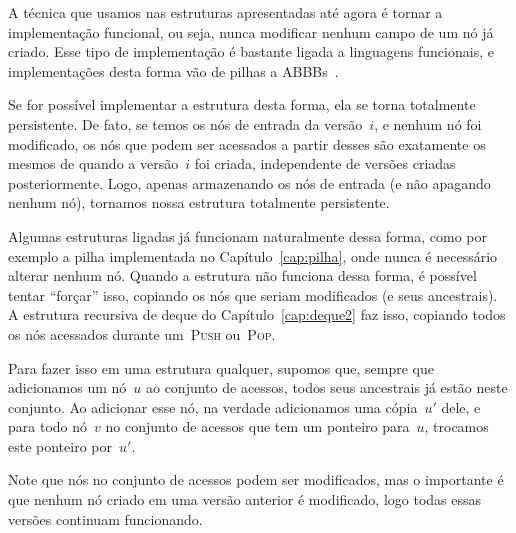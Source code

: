 \documentclass[../../main.tex]{subfiles}
\begin{document}
A técnica que usamos nas estruturas apresentadas até agora é tornar a implementação funcional, ou seja, nunca modificar nenhum campo de um nó já criado. Esse tipo de implementação é bastante ligada a linguagens funcionais, e implementações desta forma vão de pilhas a ABBBs~\cite{HoodMelville,KaplanT1999,Myers82,Myers83,Myers84}.

Se for possível implementar a estrutura desta forma, ela se torna totalmente persistente. De fato, se temos os nós de entrada da versão~$i$, e nenhum nó foi modificado, os nós que podem ser acessados a partir desses são exatamente os mesmos de quando a versão~$i$ foi criada, independente de versões criadas posteriormente. Logo, apenas armazenando os nós de entrada (e não apagando nenhum nó), tornamos nossa estrutura totalmente persistente.

Algumas estruturas ligadas já funcionam naturalmente dessa forma, como por exemplo a pilha implementada no Capítulo~\ref{cap:pilha}, onde nunca é necessário alterar nenhum nó. Quando a estrutura não funciona dessa forma, é possível tentar ``forçar'' isso, copiando os nós que seriam modificados (e seus ancestrais). A estrutura recursiva de deque do Capítulo~\ref{cap:deque2} faz isso, copiando todos os nós acessados durante um~\textsc{Push} ou~\textsc{Pop}.

Para fazer isso em uma estrutura qualquer, supomos que, sempre que adicionamos um nó~$u$ ao conjunto de acessos, todos seus ancestrais já estão neste conjunto. Ao adicionar esse nó, na verdade adicionamos uma cópia~$u'$ dele, e para todo nó~$v$ no conjunto de acessos que tem um ponteiro para~$u$, trocamos este ponteiro por~$u'$.

Note que nós no conjunto de acessos podem ser modificados, mas o importante é que nenhum nó criado em uma versão anterior é modificado, logo todas essas versões continuam funcionando.
\end{document}
